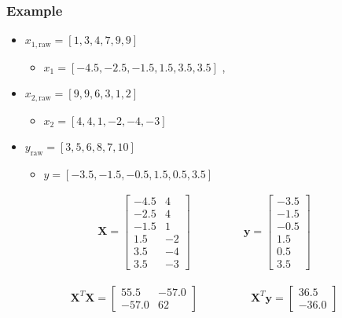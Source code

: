 \begin{frame}\frametitle{Example}
	\begin{itemize}
		\item	$x_{1,\text{raw}} = [1, 3, 4, 7, 9, 9]$
		\begin{itemize}
			\item	$x_1 = [-4.5, -2.5, -1.5 , 1.5 , 3.5, 3.5]$ ,
		\end{itemize}
		\item	$x_{2,\text{raw}} = [9, 9, 6, 3, 1, 2]$
		\begin{itemize}
			\item	$x_2 = [4, 4, 1, -2, -4, -3]$
		\end{itemize}
		\item	$y_{\text{raw}} = [3,5,6,8,7,10]$
		\begin{itemize}
			\item	$y = [-3.5, -1.5, -0.5, 1.5, 0.5, 3.5]$
		\end{itemize}
	\end{itemize}

	$$
	\begin{array}{lr}
		\mathbf{X} =
		\begin{bmatrix}
			-4.5 & 4\\
			-2.5 & 4 \\
			-1.5 & 1 \\
			1.5 & -2 \\
			3.5 & -4 \\
			3.5 & -3
		\end{bmatrix}
		&\qquad\qquad \mathbf{y} =
		\begin{bmatrix}
			-3.5 \\
			-1.5\\
			-0.5\\
			1.5\\
			0.5\\
			3.5
		\end{bmatrix}
	\end{array}
	$$

	$$
	\begin{array}{lr}
		\mathbf{X}^T\mathbf{X} =
		\begin{bmatrix}
			55.5 & -57.0 \\-57.0 & 62
		\end{bmatrix}
		&\qquad\qquad \mathbf{X}^T\mathbf{y} =
		\begin{bmatrix}
			36.5 \\
			-36.0
		\end{bmatrix}
	\end{array}
	$$
\end{frame}


